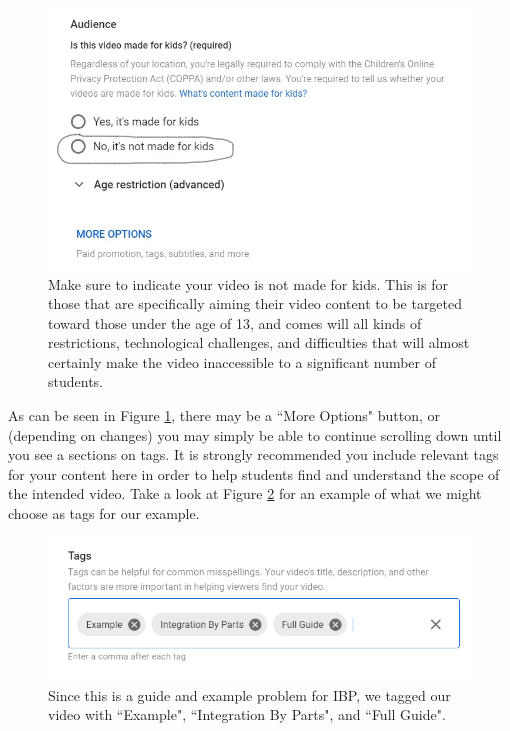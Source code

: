 \documentclass{article}
\begin{document}
        \begin{figure}[h]
            \includegraphics[width=\textwidth]{audienceMoreOptions.png}
            \caption{Make sure to indicate your video is not made for kids. This is for those that are specifically aiming their video content to be targeted toward those under the age of 13, and comes will all kinds of restrictions, technological challenges, and difficulties that will almost certainly make the video inaccessible to a significant number of students.}
            \label{ageMoreOptions}
        \end{figure}    
        
        \newpage
        As can be seen in Figure \ref{ageMoreOptions}, there may be a ``More Options" button, or (depending on changes) you may simply be able to continue scrolling down until you see a sections on tags. It is strongly recommended you include relevant tags for your content here in order to help students find and understand the scope of the intended video. Take a look at Figure \ref{tagSection} for an example of what we might choose as tags for our example.
    
        \begin{figure}[h]
            \includegraphics[width=\textwidth]{tagsList.png}
            \caption{Since this is a guide and example problem for IBP, we tagged our video with ``Example", ``Integration By Parts", and ``Full Guide".}
            \label{tagSection}
        \end{figure}
        
\end{document}
